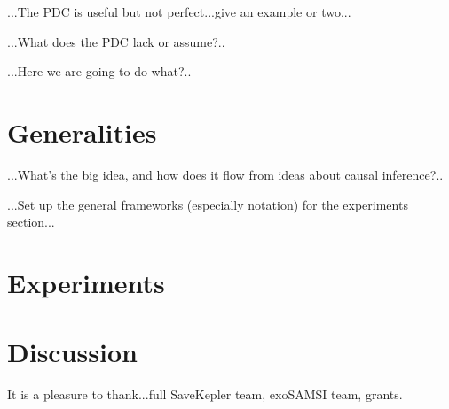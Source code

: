 \documentclass[letterpaper,12pt,preprint]{aastex}
\begin{document}
...The PDC is useful but not perfect...give an example or two...

...What does the PDC lack or assume?..

...Here we are going to do what?..

\section{Generalities}

...What's the big idea, and how does it flow from ideas about causal inference?..

...Set up the general frameworks (especially notation) for the experiments section...

\section{Experiments}

\section{Discussion}

\acknowledgements
It is a pleasure to thank...full SaveKepler team, exoSAMSI team, grants.
\end{document}
